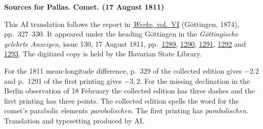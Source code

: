 \clearpage\thispagestyle{empty}
\begin{center}\textbf{Sources for Pallas. Comet. (17 August 1811)}\end{center}
\noindent This AI translation follows the report in \href{https://gdz.sub.uni-goettingen.de/id/PPN236007467}{\textit{Werke}, vol.~VI} (Göttingen, 1874), pp.~327--330. It appeared under the heading Göttingen in the \textit{Göttingische gelehrte Anzeigen}, issue 130, 17 August 1811, pp.~\href{https://api.digitale-sammlungen.de/iiif/image/v2/bsb10538680_00265/full/1600,/0/default.jpg}{1289}, \href{https://api.digitale-sammlungen.de/iiif/image/v2/bsb10538680_00266/full/1600,/0/default.jpg}{1290}, \href{https://api.digitale-sammlungen.de/iiif/image/v2/bsb10538680_00267/full/1600,/0/default.jpg}{1291}, \href{https://api.digitale-sammlungen.de/iiif/image/v2/bsb10538680_00268/full/1600,/0/default.jpg}{1292} and \href{https://api.digitale-sammlungen.de/iiif/image/v2/bsb10538680_00269/full/1600,/0/default.jpg}{1293}. The digitized copy is held by the Bavarian State Library.
\par\smallskip\noindent For the 1811 mean-longitude difference, p.~329 of the collected edition gives $-2.2$ and p.~1291 of the first printing gives $-3{,}2$. For the missing declination in the Berlin observation of 18 February the collected edition has three dashes and the first printing has three points. The collected edition spells the word for the comet’s parabolic elements \textit{parobolischen}. The first printing has \textit{parabolischen}. Translation and typesetting produced by AI.
\clearpage
